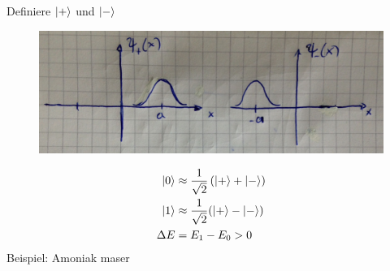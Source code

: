 \FloatBarrier
Definiere $\ket{+}$	und $\ket{-}$
	\begin{figure} [h]
		\begin{center}
			\includegraphics[width= \textwidth]{Tunneln_durch_eine_Potentialbarriere4}
		\end{center}
	\end{figure}
\FloatBarrier
	\begin{align*}
		\ket{0} &\approx \frac{1}{\sqrt{2}} \left(\ket{+} + \ket{-}\right) \\
		\ket{1} &\approx \frac{1}{\sqrt{2}} (\ket{+} - \ket{-}) \\
		\Delta E &= E_1 - E_0 > 0 
	\end{align*}
Beispiel: Amoniak maser

